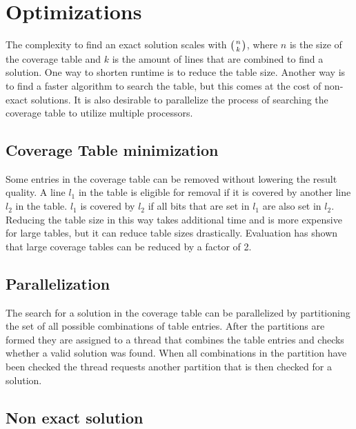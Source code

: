 \section{Optimizations}

The complexity to find an exact solution scales with $\left( n\atop k \right)$, where $n$ is the size of the coverage table and $k$ is the amount of lines that are combined to find a solution. One way to shorten runtime is to reduce the table size. Another way is to find a faster algorithm to search the table, but this comes at the cost of non-exact solutions. It is also desirable to parallelize the process of searching the coverage table to utilize multiple processors.

\subsection{Coverage Table minimization}

Some entries in the coverage table can be removed without lowering the result quality. A line $l_1$ in the table is eligible for removal if it is covered by another line $l_2$ in the table. $l_1$ is covered by $l_2$ if all bits that are set in $l_1$ are also set in $l_2$. Reducing the table size in this way takes additional time and is more expensive for large tables, but it can reduce table sizes drastically. Evaluation has shown that large coverage tables can be reduced by a factor of 2.

\subsection{Parallelization}

The search for a solution in the coverage table can be parallelized by partitioning the set of all possible combinations of table entries. After the partitions are formed they are assigned to a thread that combines the table entries and checks whether a valid solution was found. When all combinations in the partition have been checked the thread requests another partition that is then checked for a solution.

\subsection{Non exact solution}

